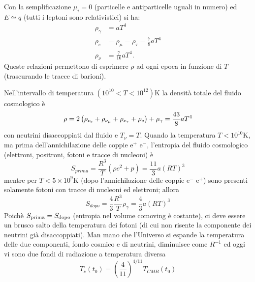Con la semplificazione $\mu_i=0$ (particelle e antiparticelle uguali in numero)
ed $E \simeq q$ (tutti i leptoni sono relativistici) si ha:
\begin{subequations}
  \begin{align}
    \rho_{\gamma} & = a T^4 \\
    \rho_e &=\rho_{\mu}=\rho_{\tau} = \frac{7}{8} a T^4 \\
    \rho_{\nu}    & = \frac{7}{16} a T^4.
  \end{align}
\end{subequations}
Queste relazioni permettono di esprimere $\rho$ ad ogni epoca in funzione di $T$
(trascurando le tracce di barioni).

Nell'intervallo di temperatura $(10^{10} < T < 10^{12})$K la densità totale del
fluido cosmologico è
\begin{equation}
  \rho = 2 \left(\rho_{\nu_\textup{e}} + \rho_{\nu_{\mu}} + \rho_{\nu_{\tau}} +
    \rho_{\textup{e}} \right)+\rho_{\gamma}=\frac{43}{8}a T^4
\end{equation}
con neutrini disaccoppiati dal fluido e $T_{\nu}=T$.  Quando la temperatura
$T<10^{10}$K, ma prima dell'annichilazione delle coppie e$^+$ e$^-$, l'entropia
del fluido cosmologico (elettroni, positroni, fotoni e tracce di nucleoni) è
\begin{equation}
  S_{prima}= \frac{R^3}{T} (\rho c^2 +p) = \frac{11}{3} a (RT)^3
\end{equation}
mentre per $T<5 \times 10^9$K (dopo l'annichilazione delle coppie e$^{-}$ e$^+$)
sono presenti solamente fotoni con tracce di nucleoni ed elettroni; allora
\begin{equation}
  S_{dopo}= \frac{4}{3}\frac{R^3}{T} \rho_{\gamma} = \frac{4}{3} a (RT)^3
\end{equation}
Poichè $S_{\textup{prima}} = S_{\textup{dopo}}$ (entropia nel volume comoving è
costante), ci deve essere un brusco salto della temperatura dei fotoni (di cui
non risente la componente dei neutrini già disaccoppiati).  Man mano che
l'Universo si espande la temperatura delle due componenti, fondo cosmico e di
neutrini, diminuisce come $R^{-1}$ ed oggi vi sono due fondi di radiazione a
temperatura diversa
\begin{equation}
  T_{\nu}(t_0) = \left(\frac{4}{11}\right)^{4/11} T_{CMB}(t_0)
\end{equation}

